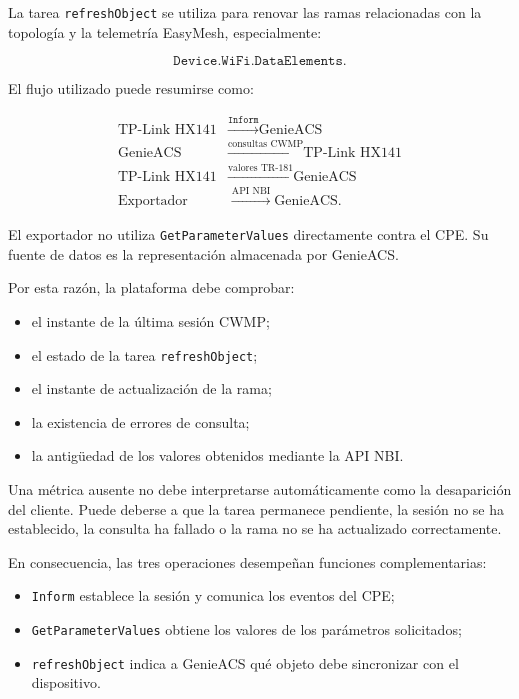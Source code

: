 La tarea \texttt{refreshObject} se utiliza para renovar las ramas
relacionadas con la topología y la telemetría EasyMesh, especialmente:

\[
    \texttt{Device.WiFi.DataElements.}
\]

El flujo utilizado puede resumirse como:

\[
\begin{aligned}
    \text{TP-Link HX141}
    &\xrightarrow{\texttt{Inform}}
    \text{GenieACS}\\
    \text{GenieACS}
    &\xrightarrow{\text{consultas CWMP}}
    \text{TP-Link HX141}\\
    \text{TP-Link HX141}
    &\xrightarrow{\text{valores TR-181}}
    \text{GenieACS}\\
    \text{Exportador}
    &\xrightarrow{\text{API NBI}}
    \text{GenieACS}.
\end{aligned}
\]

El exportador no utiliza \texttt{GetParameterValues} directamente contra
el CPE. Su fuente de datos es la representación almacenada por GenieACS.

Por esta razón, la plataforma debe comprobar:

\begin{itemize}
    \item el instante de la última sesión CWMP;
    \item el estado de la tarea \texttt{refreshObject};
    \item el instante de actualización de la rama;
    \item la existencia de errores de consulta;
    \item la antigüedad de los valores obtenidos mediante la API NBI.
\end{itemize}

Una métrica ausente no debe interpretarse automáticamente como la
desaparición del cliente. Puede deberse a que la tarea permanece
pendiente, la sesión no se ha establecido, la consulta ha fallado o la
rama no se ha actualizado correctamente.

En consecuencia, las tres operaciones desempeñan funciones
complementarias:

\begin{itemize}
    \item \texttt{Inform} establece la sesión y comunica los eventos del
    CPE;

    \item \texttt{GetParameterValues} obtiene los valores de los
    parámetros solicitados;

    \item \texttt{refreshObject} indica a GenieACS qué objeto debe
    sincronizar con el dispositivo.
\end{itemize}

